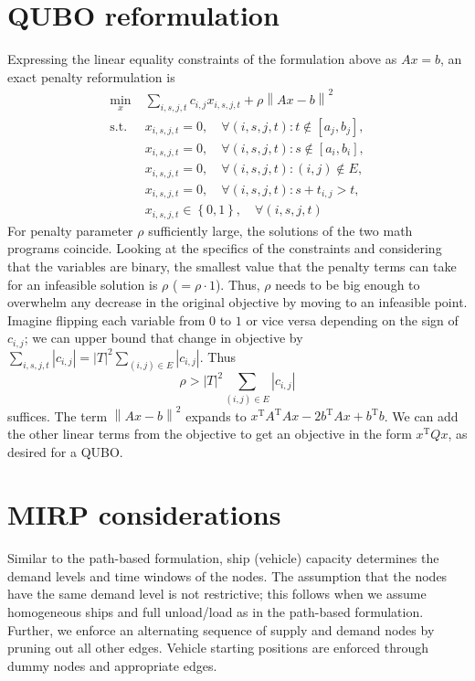 \documentclass[11pt]{article}
\theoremstyle{definition}
\newcommand{\card}[1]{\left| #1 \right|}
\newcommand{\st}{\mathrm{s.t.}\;}
\newcommand{\tr}{^{\mathrm{T}}}
\newcommand{\abs}[1]{\left| #1 \right|}
\newcommand{\norm}[1]{\left\| #1 \right\|}
\newcommand{\set}[1]{\left\{ #1 \right\}}
\newcommand{\0}{\mathbf{0}}
\begin{document}
\section{QUBO reformulation}
Expressing the linear equality constraints of the formulation above as $Ax = b$, an exact penalty reformulation is 
\begin{equation}
\label{qubo}
\begin{aligned}
\min_x\; &\sum_{i,s,j,t} c_{i,j} x_{i,s,j,t} + \rho\norm{Ax - b}^2 \\
\st 
&x_{i,s,j,t} = 0, \quad \forall (i,s,j,t): t \notin [a_j,b_j], \\
&x_{i,s,j,t} = 0, \quad \forall (i,s,j,t): s \notin [a_i,b_i], \\
&x_{i,s,j,t} = 0, \quad \forall (i,s,j,t): (i,j) \notin E, \\
&x_{i,s,j,t} = 0, \quad \forall (i,s,j,t): s + t_{i,j} > t, \\
&x_{i,s,j,t} \in \set{0,1}, \quad \forall (i,s,j,t)
\end{aligned}
\end{equation}
For penalty parameter $\rho$ sufficiently large, the solutions of the two math programs coincide.
Looking at the specifics of the constraints and considering that the variables are binary, the smallest value that the penalty terms can take for an infeasible solution is $\rho$ ($=\rho\cdot 1$).
Thus, $\rho$ needs to be big enough to overwhelm any decrease in the original objective by moving to an infeasible point.
Imagine flipping each variable from $0$ to $1$ or vice versa depending on the sign of $c_{i,j}$;
we can upper bound that change in objective by
$\sum_{i,s,j,t} \abs{c_{i,j}} = \card{T}^2 \sum_{(i,j) \in E} \abs{c_{i,j}}$.
Thus 
\[
\rho > \card{T}^2 \sum_{(i,j) \in E} \abs{c_{i,j}}
\]
suffices.
%
The term $\norm{Ax - b}^2$ expands to $x\tr A\tr A x - 2 b\tr Ax + b\tr b$.
We can add the other linear terms from the objective to get an objective in the form $x\tr Q x$, as desired for a QUBO.


\section{MIRP considerations}
Similar to the path-based formulation, ship (vehicle) capacity determines the demand levels and time windows of the nodes.
The assumption that the nodes have the same demand level is not restrictive;
this follows when we assume homogeneous ships and full unload/load as in the path-based formulation.
Further, we enforce an alternating sequence of supply and demand nodes by pruning out all other edges.
Vehicle starting positions are enforced through dummy nodes and appropriate edges.

%
\end{document}

